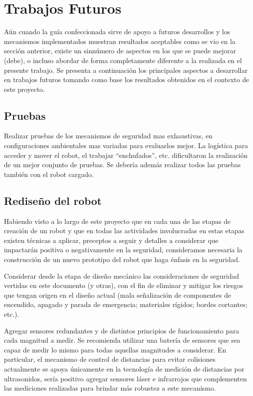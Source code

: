 \documentclass[withindex,glossary]{cam-thesis}
\begin{document}
\section{Trabajos Futuros}
Aún cuando la guía confeccionada sirve de apoyo a futuros desarrollos y los mecanismos implementados muestran resultados aceptables como se vio en la sección anterior, existe un sinnúmero de aspectos en los que se puede mejorar (debe), o incluso abordar de forma completamente diferente a la realizada en el presente trabajo.
Se presenta a continuación los principales aspectos a desarrollar en trabajos futuros tomando como base los resultados obtenidos en el contexto de este proyecto.

\subsection{Pruebas}
Realizar pruebas de los mecanismos de seguridad mas exhaustivas, en configuraciones ambientales mas variadas para evaluarlos mejor. La logística para acceder y mover el robot, el trabajar ``enchufados'', etc. dificultaron la realización de un mejor conjunto de pruebas. Se debería además realizar todos las pruebas también con el robot cargado.
\subsection{Rediseño del robot}
Habiendo visto a lo largo de este proyecto que en cada una de las etapas de creación de un robot y que en todas las actividades involucradas en estas etapas existen técnicas a aplicar, preceptos a seguir y detalles a considerar que impactarán positiva o negativamente en la seguridad, consideramos necesaria la construcción de un nuevo prototipo del robot que haga énfasis en la seguridad.

Considerar desde la etapa de diseño mecánico las consideraciones de seguridad vertidas en este documento (y otras), con el fin de eliminar y mitigar los riesgos que tengan origen en el diseño actual (mala señalización de componentes de encendido, apagado y parada de emergencia; materiales rígidos; bordes cortantes; etc.).

Agregar sensores redundantes y de distintos principios de funcionamiento para cada magnitud a medir. Se recomienda utilizar una batería de sensores que sea capaz de medir lo mismo para todas aquellas magnitudes a considerar. En particular, el mecanismo de control de distancias para evitar colisiones actualmente se apoya únicamente en la tecnología de medición de distancias por ultrasonidos, sería positivo agregar sensores láser e infrarrojos que complementen las mediciones realizadas para brindar más robustez a este mecanismo.
\end{document}
